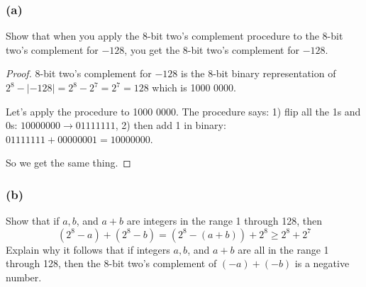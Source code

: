 \documentclass[14pt]{extarticle}
\begin{document}
\subsubsection{(a)}
Show that when you apply the 8-bit two's complement procedure to the 8-bit two’s complement for $-128$, you get the 8-bit two’s complement for $-128$.

\begin{proof}
    8-bit two's complement for $-128$ is the 8-bit binary representation of $2^8 - |-128| = 2^8 - 2^7 = 2^7 = 128$ which is 1000 0000.

    Let's apply the procedure to 1000 0000. The procedure says: 1) flip all the 1s and 0s: $1000 0000 \to 0111 1111$, 2) then add 1 in binary: $0111 1111 + 0000 0001 = 1000 0000$.

    So we get the same thing.
\end{proof}

\subsubsection{(b)}
Show that if $a, b$, and $a + b$ are integers in the range 1 through 128, then $$ (2^8 - a) + (2^8 - b) = (2^8 - (a + b)) + 2^8 \geq 2^8 + 2^7 $$ Explain why it follows that if integers $a, b$, and $a + b$ are all in the range 1 through 128, then the 8-bit two’s complement of $(-a) + (-b)$ is a negative number.
\end{document}
